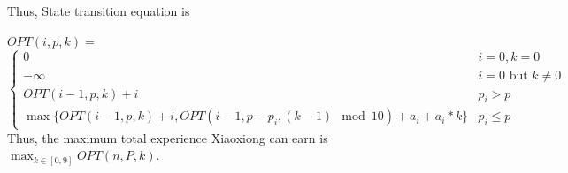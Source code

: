 Thus, State transition equation is
\newline

\noindent $OPT(i,p,k)=$
\begin{equation*}
    \left\{\begin{matrix}
 0&i=0 ,k = 0\\
 -\infty&i=0  \text{ but } k \neq 0\\
 OPT(i-1, p,k) + i& p_i>p\\
 \max\{OPT(i-1, p,k) + i,OPT(i-1,p-p_i,(k-1) \mod 10)+ a_i + a_i * k \}&p_i\leq p
\end{matrix}\right.
\end{equation*}
Thus, the maximum total experience Xiaoxiong can earn is $\max_{k \in [0,9]} OPT(n,P,k)$.
 

\newpage
